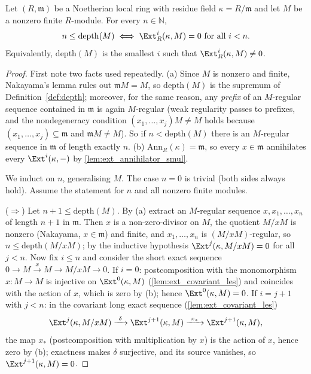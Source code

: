 \begin{theorem}
  \label{thm:depth_ext}
  \leanok
  Let \((R, \mathfrak m)\) be a Noetherian local ring with residue field
  \(\kappa = R/\mathfrak m\) and let \(M\) be a nonzero finite \(R\)-module. For every
  \(n \in \mathbb{N}\),
  \[
    n \leq \mathrm{depth}(M)
    \iff
    \Ext^i_R(\kappa, M) = 0 \text{ for all } i < n.
  \]
  Equivalently, \(\mathrm{depth}(M)\) is the smallest \(i\) such that
  \(\Ext^i_R(\kappa, M) \neq 0\).
\end{theorem}
\begin{proof}
  \leanok
  First note two facts used repeatedly. (a) Since \(M\) is nonzero and finite,
  Nakayama's lemma rules out \(\mathfrak m M = M\), so \(\mathrm{depth}(M)\) is the
  supremum of Definition~\ref{def:depth}; moreover, for the same reason, any
  \emph{prefix} of an \(M\)-regular sequence contained in \(\mathfrak m\) is again
  \(M\)-regular (weak regularity passes to prefixes, and the nondegeneracy condition
  \((x_1,\dots,x_j)M \neq M\) holds because \((x_1,\dots,x_j) \subseteq \mathfrak m\) and
  \(\mathfrak m M \neq M\)). So if \(n < \mathrm{depth}(M)\) there is an \(M\)-regular
  sequence in \(\mathfrak m\) of length exactly \(n\). (b) \(\mathrm{Ann}_R(\kappa) =
  \mathfrak m\), so every \(x \in \mathfrak m\) annihilates every \(\Ext^i(\kappa, -)\)
  by \ref{lem:ext_annihilator_smul}.

  We induct on \(n\), generalising \(M\). The case \(n = 0\) is trivial (both sides
  always hold). Assume the statement for \(n\) and all nonzero finite modules.

  (\(\Rightarrow\)) Let \(n + 1 \leq \mathrm{depth}(M)\). By (a) extract an
  \(M\)-regular sequence \(x, x_1, \dots, x_n\) of length \(n+1\) in \(\mathfrak m\).
  Then \(x\) is a non-zero-divisor on \(M\), the quotient \(M/xM\) is nonzero (Nakayama,
  \(x \in \mathfrak m\)) and finite, and \(x_1, \dots, x_n\) is \((M/xM)\)-regular, so
  \(n \leq \mathrm{depth}(M/xM)\); by the inductive hypothesis
  \(\Ext^j(\kappa, M/xM) = 0\) for all \(j < n\). Now fix \(i \leq n\) and consider the
  short exact sequence \(0 \to M \xrightarrow{x} M \to M/xM \to 0\). If \(i = 0\):
  postcomposition with the monomorphism \(x : M \to M\) is injective on
  \(\Ext^0(\kappa, M)\) (\ref{lem:ext_covariant_les}) and coincides with the action of
  \(x\), which is zero by (b); hence \(\Ext^0(\kappa, M) = 0\). If \(i = j + 1\) with
  \(j < n\): in the covariant long exact sequence (\ref{lem:ext_covariant_les})
  \[
    \Ext^{j}(\kappa, M/xM) \xrightarrow{\ \delta\ } \Ext^{j+1}(\kappa, M)
      \xrightarrow{\ x_*\ } \Ext^{j+1}(\kappa, M),
  \]
  the map \(x_*\) (postcomposition with multiplication by \(x\)) is the action of \(x\),
  hence zero by (b); exactness makes \(\delta\) surjective, and its source vanishes, so
  \(\Ext^{j+1}(\kappa, M) = 0\).


\end{proof}
